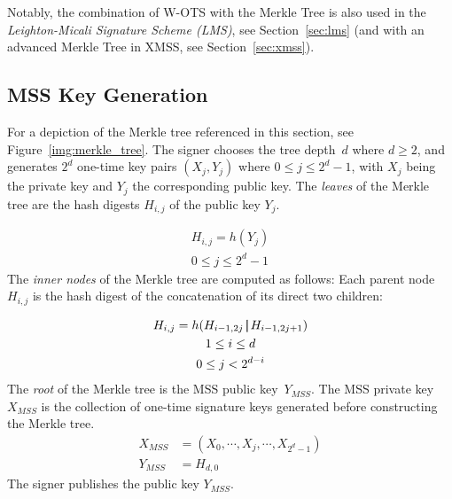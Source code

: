 Notably, the combination of W-OTS with the Merkle Tree is also used in the \textit{Leighton-Micali Signature Scheme (LMS)}, see Section~\ref{sec:lms} (and with an advanced Merkle Tree in XMSS, see Section~\ref{sec:xmss}).

\subsection{MSS Key Generation}
\label{cha:mss_keygen}
For a depiction of the Merkle tree referenced in this section, see Figure~\ref{img:merkle_tree}.
The signer chooses the tree depth~$d$ where $d \geq 2$, and generates $2^d$ one-time key pairs $(X_j, Y_j)$ where $0 \leq j \leq 2^d-1$, with $X_j$ being the private key and $Y_j$ the corresponding public key. The \textit{leaves} of the Merkle tree are the hash digests $H_{i,j}$ of the public key $Y_j$. 

\begin{gather}
\label{eq:leaf_merkle_tree:hash_digest_publ_key_Y}
H_{i,j} = h(Y_j) \\ 
0 \leq j \leq 2^d - 1 \nonumber
\end{gather}
The \textit{inner nodes} of the Merkle tree are computed as follows: Each parent node $H_{i,j}$ is the hash digest of the concatenation of its direct two children: %

\begin{gather}
\label{eq:inner_nodes_merkle_tree_keygen}
H_{i,j} = h(H_{i-1,2j} \operatorname{|\!\!|} H_{i-1,2j+1}) \\
1 \leq i \leq d \nonumber \\ 
0 \leq j < 2^{d - i} \nonumber
\end{gather} 
The \textit{root} of the Merkle tree is the MSS public key~$Y_{MSS}$. The MSS private key~$X_{MSS}$ is the collection of one-time signature keys generated before constructing the Merkle tree.
\begin{align}
\label{eq:mss_priv_key}
X_{MSS} &= (X_0, \cdots, X_j, \cdots, X_{2^d - 1} ) \\
Y_{MSS} &= H_{d,0} \nonumber
\end{align}
The signer publishes the public key $Y_{MSS}$.

